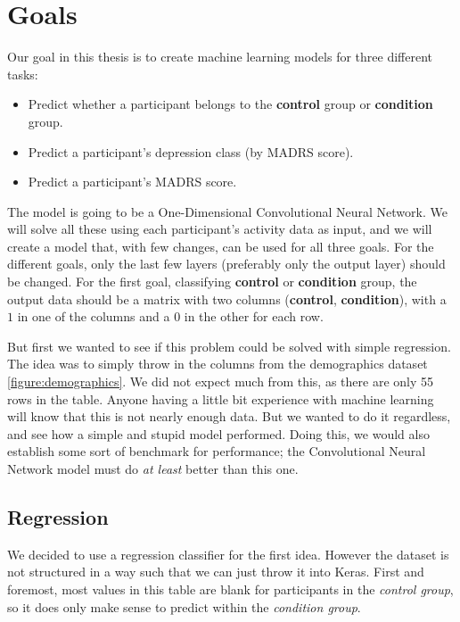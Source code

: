\section{Goals}

Our goal in this thesis is to create machine learning models for three different tasks:

\begin{itemize}
  \item Predict whether a participant belongs to the \textbf{control} group or \textbf{condition} group.
  \item Predict a participant's depression class (by MADRS score).
  \item Predict a participant's MADRS score.
\end{itemize}

The model is going to be a One-Dimensional Convolutional Neural Network. 
We will solve all these using each participant's activity data as input, and we will create a model that, with few changes, can be used for all three goals.
For the different goals, only the last few layers (preferably only the output layer) should be changed. For the first goal, 
classifying \textbf{control} or \textbf{condition} group, the output data should be a matrix with two columns (\textbf{control}, \textbf{condition}), 
with a $1$ in one of the columns and a $0$ in the other for each row.

But first we wanted to see if this problem could be solved with simple regression. The idea was to simply throw in the columns from the 
demographics dataset \ref{figure:demographics}. We did not expect much from this, as there are only 55 rows in the table. Anyone having a little bit experience 
with machine learning will know that this is not nearly enough data. But we wanted to do it regardless, and see how a simple and stupid model performed.
Doing this, we would also establish some sort of benchmark for performance; the Convolutional Neural Network model must do \textit{at least} better than this one.

\subsection{Regression}

We decided to use a regression classifier for the first idea. However the dataset is not structured in a way such that we can just throw it into Keras.
First and foremost, most values in this table are blank for participants in the \textit{control group}, so it does only make sense to predict within 
the \textit{condition group}. 

